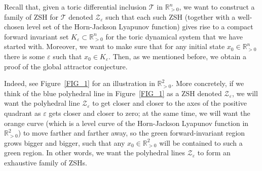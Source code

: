\documentclass[12pt,letterpaper]{article}
\newtheorem{rem}[thm]{Remark}
\newcommand{\T}{\mathcal{T}}
\newcommand{\Z}{\mathcal{Z}}
\newcommand{\RRp}{\mathbb{R}_{>0}}
\newcommand{\eps}{\varepsilon}
\begin{document}



Recall that, given a toric differential inclusion $\T$ in $\RRp^n$, we want to construct a family of ZSH for $\T$ denoted $\Z_\eps$ such that each such ZSH (together with a well-chosen level set of the Horn-Jackson Lyapunov function) gives rise to a compact forward invariant set $K_{\eps} \subset \RRp^n$ for the toric dynamical system that we have started with. Moreover, we want to make sure that for any initial state $x_0 \in \RRp^n$ there is some $\eps$ such that  $x_0 \in K_{\eps}$.  Then, as we mentioned before, we obtain a proof of the global attractor conjecture.



\bigskip


Indeed, see Figure~\ref{FIG_1} for an illustration in $\RRp^2$. More concretely, if we think of the blue polyhedral line in Figure~\ref{FIG_1} as a ZSH denoted $\Z_\eps$, we will want the polyhedral line $\Z_\eps$ to get closer and closer to the axes of the positive quadrant as $\eps$ gets closer and closer to zero; at the same time, we will want the orange curve (which is a level curve of the Horn-Jackson Lyapunov function in $\RRp^2$) to move farther and farther away, so the green forward-invariant region grows bigger and bigger, such that any $x_0 \in \RRp^2$ will be contained to such a green region. In other words, we want the polyhedral lines $\Z_\eps$ to form an exhaustive family of ZSHs.





















\newpage
\end{document}
